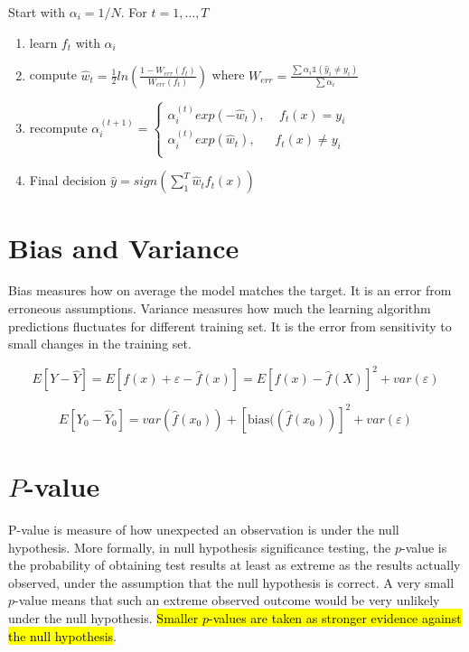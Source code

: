 \noindent \textbf{{{\color{red}{Ada Boost}}}}
Start with $\alpha_i=1/N$. For $t=1, \dots, T$ 
\begin{enumerate}
\item learn $f_t$ with $\alpha_i$
\item compute $\hat w_t = \frac{1}{2} ln \left(  \frac{1-W_{err}(f_t)}{W_{err}(f_t)}   \right)$
where  $W_{err} = \frac{   \sum \alpha_i \mathbb{1}(\hat y_i \neq y_i)  }{\sum \alpha_i}$
\item recompute 
$
\alpha_i^{(t+1)} =  \begin{cases} 
  \alpha_i^{(t)} exp(-\hat w_t),  ~~~~~  f_t(x)= y_i\\
  \alpha_i^{(t)} exp(\hat w_t),    ~~~~~~~ f_t(x) \neq y_i\\
\end{cases}
$
\item Final decision $\hat y = sign(\sum_1^T \hat w_t f_t(x))$
\end{enumerate}

\section{Bias and Variance}
\label{sec:Bias_and_Variance_interview}
Bias measures how on average the model
matches the target. It is an error from
erroneous assumptions. Variance measures
how much the learning algorithm predictions
fluctuates for different training set.
It is the error from sensitivity to small changes 
in the training set.

\[ E[Y - \hat Y] = E[f(x) + \varepsilon - \hat f(x)] = E[f(x) - \hat f(X)]^2 + var(\varepsilon) \]

\[ E[Y_0 - \hat Y_0] =  var(\hat f(x_0)) + 
[\text{bias}((\hat f(x_0))]^2 + var(\varepsilon) \]


\section{$P$-value}
\label{sec:P_value_Interview}
P-value is measure of how unexpected an observation is under the null hypothesis.
More formally, in null hypothesis significance testing, the $p$-value is the probability 
of obtaining test results at least as extreme as the results 
actually observed, under the assumption that the null hypothesis is 
correct. A very small $p$-value means that such an extreme observed 
outcome would be very unlikely under the null hypothesis.
\hl{Smaller $p$-values are taken as stronger evidence against the null hypothesis}.

